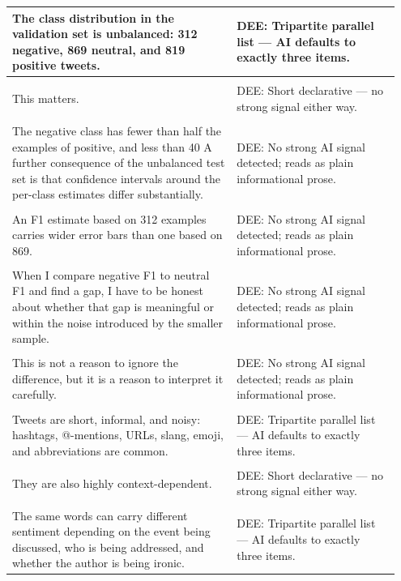 \documentclass[11pt]{article}
\begin{document}
\begin{longtable}{|p{0.55\linewidth}|p{0.40\linewidth}|}
\hline
The class distribution in the validation set is unbalanced: 312 negative, 869 neutral, and 819 positive tweets. & DEE: Tripartite parallel list --- AI defaults to exactly three items. \\[2pt]
\hline
\rule{0pt}{3.5cm} & \\
\hline
This matters. & DEE: Short declarative --- no strong signal either way. \\[2pt]
\hline
\rule{0pt}{3.5cm} & \\
\hline
The negative class has fewer than half the examples of positive, and less than 40 A further consequence of the unbalanced test set is that confidence intervals around the per-class estimates differ substantially. & DEE: No strong AI signal detected; reads as plain informational prose. \\[2pt]
\hline
\rule{0pt}{3.5cm} & \\
\hline
An F1 estimate based on 312 examples carries wider error bars than one based on 869. & DEE: No strong AI signal detected; reads as plain informational prose. \\[2pt]
\hline
\rule{0pt}{3.5cm} & \\
\hline
When I compare negative F1 to neutral F1 and find a gap, I have to be honest about whether that gap is meaningful or within the noise introduced by the smaller sample. & DEE: No strong AI signal detected; reads as plain informational prose. \\[2pt]
\hline
\rule{0pt}{3.5cm} & \\
\hline
This is not a reason to ignore the difference, but it is a reason to interpret it carefully. & DEE: No strong AI signal detected; reads as plain informational prose. \\[2pt]
\hline
\rule{0pt}{3.5cm} & \\
\hline
Tweets are short, informal, and noisy: hashtags, @-mentions, URLs, slang, emoji, and abbreviations are common. & DEE: Tripartite parallel list --- AI defaults to exactly three items. \\[2pt]
\hline
\rule{0pt}{3.5cm} & \\
\hline
They are also highly context-dependent. & DEE: Short declarative --- no strong signal either way. \\[2pt]
\hline
\rule{0pt}{3.5cm} & \\
\hline
The same words can carry different sentiment depending on the event being discussed, who is being addressed, and whether the author is being ironic. & DEE: Tripartite parallel list --- AI defaults to exactly three items. \\[2pt]

\end{longtable}
\end{document}

